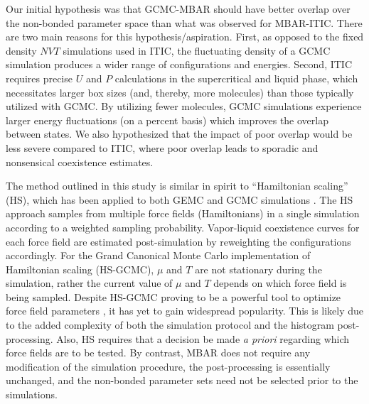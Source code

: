 \documentclass[journal=jced,manuscript=article]{achemso}
\begin{document}

Our initial hypothesis was that GCMC-MBAR should have better overlap over the non-bonded parameter space than what was observed for MBAR-ITIC. There are two main reasons for this hypothesis/aspiration. First, as opposed to the fixed density $NVT$ simulations used in ITIC, the fluctuating density of a GCMC simulation produces a wider range of configurations and energies. Second, ITIC requires precise $U$ and $P$ calculations in the supercritical and liquid phase, which necessitates larger box sizes (and, thereby, more molecules) than those typically utilized with GCMC. By utilizing fewer molecules, GCMC simulations experience larger energy fluctuations (on a percent basis) which improves the overlap between states. We also hypothesized that the impact of poor overlap would be less severe compared to ITIC, where poor overlap leads to sporadic and nonsensical coexistence estimates.  



The method outlined in this study is similar in spirit to ``Hamiltonian scaling'' (HS), which has been applied to both GEMC \cite{Kiyohara1996} and GCMC simulations \cite{Errington1998,Exp6,Errington1999,Pana2000}. The HS approach samples from multiple force fields (Hamiltonians) in a single simulation according to a weighted sampling probability. Vapor-liquid coexistence curves for each force field are estimated post-simulation by reweighting the configurations accordingly. For the Grand Canonical Monte Carlo implementation of Hamiltonian scaling (HS-GCMC), $\mu$ and $T$ are not stationary during the simulation, rather the current value of $\mu$ and $T$ depends on which force field is being sampled. Despite HS-GCMC proving to be a powerful tool to optimize force field parameters \cite{Errington1998,Exp6,Errington1999,Pana2000}, it has yet to gain widespread popularity. This is likely due to the added complexity of both the simulation protocol and the histogram post-processing. Also, HS requires that a decision be made \textit{a priori} regarding which force fields are to be tested. By contrast, MBAR does not require any modification of the simulation procedure, the post-processing is essentially unchanged, and the non-bonded parameter sets need not be selected prior to the simulations.
\end{document}
